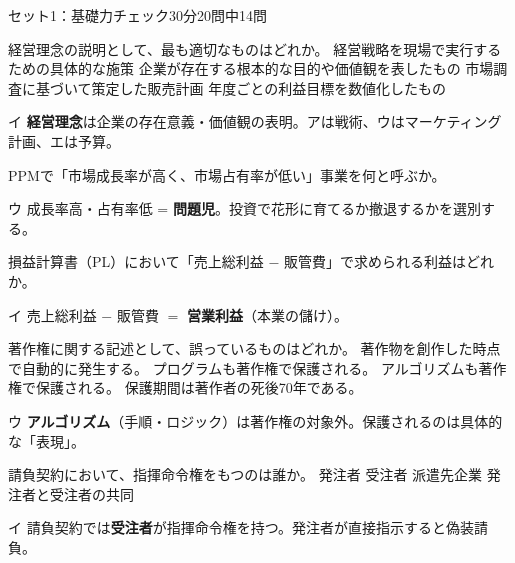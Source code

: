 \begin{mogishi}{セット1：基礎力チェック}{30分}{20問中14問}

\begin{itpmon}[\diffbadge{基}]{経営理念の説明として、最も適切なものはどれか。}
\sentakushi
  {経営戦略を現場で実行するための具体的な施策}
  {企業が存在する根本的な目的や価値観を表したもの}
  {市場調査に基づいて策定した販売計画}
  {年度ごとの利益目標を数値化したもの}
\end{itpmon}
\begin{kaisetsu}{イ}
\textbf{経営理念}は企業の存在意義・価値観の表明。アは戦術、ウはマーケティング計画、エは予算。
\end{kaisetsu}

\begin{itpmon}[\diffbadge{基}]{PPMで「市場成長率が高く、市場占有率が低い」事業を何と呼ぶか。}
\end{itpmon}
\begin{kaisetsu}{ウ}
成長率高・占有率低 = \textbf{問題児}。投資で花形に育てるか撤退するかを選別する。
\end{kaisetsu}

\begin{itpmon}[\diffbadge{標}]{損益計算書（PL）において「売上総利益 $-$ 販管費」で求められる利益はどれか。}
\end{itpmon}
\begin{kaisetsu}{イ}
売上総利益 $-$ 販管費 $=$ \textbf{営業利益}（本業の儲け）。
\end{kaisetsu}

\begin{itpmon}[\diffbadge{標}]{著作権に関する記述として、誤っているものはどれか。}
\sentakushi
  {著作物を創作した時点で自動的に発生する。}
  {プログラムも著作権で保護される。}
  {アルゴリズムも著作権で保護される。}
  {保護期間は著作者の死後70年である。}
\end{itpmon}
\begin{kaisetsu}{ウ}
\textbf{アルゴリズム}（手順・ロジック）は著作権の対象外。保護されるのは具体的な「表現」。
\end{kaisetsu}

\begin{itpmon}[\diffbadge{基}]{請負契約において、指揮命令権をもつのは誰か。}
\sentakushi
  {発注者}
  {受注者}
  {派遣先企業}
  {発注者と受注者の共同}
\end{itpmon}
\begin{kaisetsu}{イ}
請負契約では\textbf{受注者}が指揮命令権を持つ。発注者が直接指示すると偽装請負。
\end{kaisetsu}


\end{mogishi}
